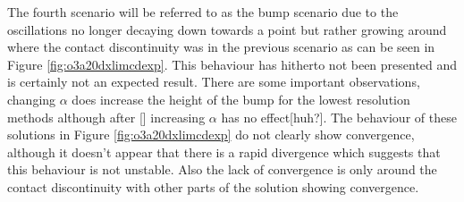\documentclass[SingleSpace,12pt,Proceedings]{Serre_ASCE}
\begin{document}
The fourth scenario will be referred to as the bump scenario due to the oscillations no longer decaying down towards a point but rather growing around where the contact discontinuity was in the previous scenario as can be seen in Figure \ref{fig:o3a20dxlimcdexp}. This behaviour has hitherto not been presented and is certainly not an expected result. There are some important observations, changing $\alpha$ does increase the height of the bump for the lowest resolution methods although after [] increasing $\alpha$ has no effect[huh?]. The behaviour of these solutions in Figure \ref{fig:o3a20dxlimcdexp} do not clearly show convergence, although it doesn't appear that there is a rapid divergence which suggests that this behaviour is not unstable. Also the lack of convergence is only around the contact discontinuity with other parts of the solution showing convergence. 
\end{document}
